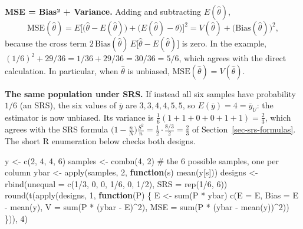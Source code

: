 \documentclass[
  letterpaper,
  DIV=11,
  numbers=noendperiod]{scrreprt}
\newenvironment{Shaded}{\begin{snugshade}}{\end{snugshade}}
\newcommand{\AttributeTok}[1]{\textcolor[rgb]{0.40,0.45,0.13}{#1}}
\newcommand{\CommentTok}[1]{\textcolor[rgb]{0.37,0.37,0.37}{#1}}
\newcommand{\ControlFlowTok}[1]{\textcolor[rgb]{0.00,0.23,0.31}{\textbf{#1}}}
\newcommand{\DecValTok}[1]{\textcolor[rgb]{0.68,0.00,0.00}{#1}}
\newcommand{\FunctionTok}[1]{\textcolor[rgb]{0.28,0.35,0.67}{#1}}
\newcommand{\NormalTok}[1]{\textcolor[rgb]{0.00,0.23,0.31}{#1}}
\newcommand{\OtherTok}[1]{\textcolor[rgb]{0.00,0.23,0.31}{#1}}
\newcommand{\SpecialCharTok}[1]{\textcolor[rgb]{0.37,0.37,0.37}{#1}}
\renewcommand{\[}{\begin{equation}}
\renewcommand{\]}{\end{equation}}
\begin{document}
\textbf{MSE = Bias² + Variance.} Adding and subtracting
\(E(\hat\theta)\), \[
\text{MSE}(\hat\theta)
 = E\Big[\big(\hat\theta - E(\hat\theta)\big) + \big(E(\hat\theta) - \theta\big)\Big]^2
 = V(\hat\theta) + \big(\text{Bias}(\hat\theta)\big)^2 ,
\] because the cross term
\(2\,\text{Bias}(\hat\theta)\,E\big[\hat\theta - E(\hat\theta)\big]\) is
zero. In the example, \((1/6)^2 + 29/36 = 1/36 + 29/36 = 30/36 = 5/6\),
which agrees with the direct calculation. In particular, when
\(\hat\theta\) is unbiased, \(\text{MSE}(\hat\theta) = V(\hat\theta)\).

\textbf{The same population under SRS.} If instead all six samples have
probability \(1/6\) (an SRS), the six values of \(\bar y\) are
\(3, 3, 4, 4, 5, 5\), so \(E(\bar y) = 4 = \bar y_U\): the estimator is
now unbiased. Its variance is \(\frac16(1+1+0+0+1+1) = \frac23\), which
agrees with the SRS formula
\(\big(1-\frac nN\big)\frac{S^2}{n} = \frac12\cdot\frac{8/3}{2} = \frac23\)
of Section~\ref{sec-srs-formulas}. The short R enumeration below checks
both designs.

\begin{Shaded}
\begin{Highlighting}[]
\NormalTok{y }\OtherTok{\textless{}{-}} \FunctionTok{c}\NormalTok{(}\DecValTok{2}\NormalTok{, }\DecValTok{4}\NormalTok{, }\DecValTok{4}\NormalTok{, }\DecValTok{6}\NormalTok{)}
\NormalTok{samples }\OtherTok{\textless{}{-}} \FunctionTok{combn}\NormalTok{(}\DecValTok{4}\NormalTok{, }\DecValTok{2}\NormalTok{)                        }\CommentTok{\# the 6 possible samples, one per column}
\NormalTok{ybar }\OtherTok{\textless{}{-}} \FunctionTok{apply}\NormalTok{(samples, }\DecValTok{2}\NormalTok{, }\ControlFlowTok{function}\NormalTok{(s) }\FunctionTok{mean}\NormalTok{(y[s]))}
\NormalTok{designs }\OtherTok{\textless{}{-}} \FunctionTok{rbind}\NormalTok{(}\AttributeTok{unequal =} \FunctionTok{c}\NormalTok{(}\DecValTok{1}\SpecialCharTok{/}\DecValTok{3}\NormalTok{, }\DecValTok{0}\NormalTok{, }\DecValTok{0}\NormalTok{, }\DecValTok{1}\SpecialCharTok{/}\DecValTok{6}\NormalTok{, }\DecValTok{0}\NormalTok{, }\DecValTok{1}\SpecialCharTok{/}\DecValTok{2}\NormalTok{),}
                 \AttributeTok{SRS     =} \FunctionTok{rep}\NormalTok{(}\DecValTok{1}\SpecialCharTok{/}\DecValTok{6}\NormalTok{, }\DecValTok{6}\NormalTok{))}
\FunctionTok{round}\NormalTok{(}\FunctionTok{t}\NormalTok{(}\FunctionTok{apply}\NormalTok{(designs, }\DecValTok{1}\NormalTok{, }\ControlFlowTok{function}\NormalTok{(P) \{}
\NormalTok{  E }\OtherTok{\textless{}{-}} \FunctionTok{sum}\NormalTok{(P }\SpecialCharTok{*}\NormalTok{ ybar)}
  \FunctionTok{c}\NormalTok{(}\AttributeTok{E =}\NormalTok{ E, }\AttributeTok{Bias =}\NormalTok{ E }\SpecialCharTok{{-}} \FunctionTok{mean}\NormalTok{(y), }\AttributeTok{V =} \FunctionTok{sum}\NormalTok{(P }\SpecialCharTok{*}\NormalTok{ (ybar }\SpecialCharTok{{-}}\NormalTok{ E)}\SpecialCharTok{\^{}}\DecValTok{2}\NormalTok{), }\AttributeTok{MSE =} \FunctionTok{sum}\NormalTok{(P }\SpecialCharTok{*}\NormalTok{ (ybar }\SpecialCharTok{{-}} \FunctionTok{mean}\NormalTok{(y))}\SpecialCharTok{\^{}}\DecValTok{2}\NormalTok{))}
\NormalTok{\})), }\DecValTok{4}\NormalTok{)}
\end{Highlighting}
\end{Shaded}
\end{document}
